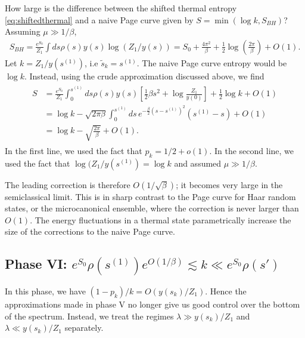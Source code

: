 \documentclass[11pt]{article}
\renewcommand{\tilde}{\widetilde}
\newcommand{\smax}{s_k}
\newcommand{\stilde}{\tilde{s}_k}
\newcommand{\sprime}{s'}
\numberwithin{equation}{section}
\begin{document}
How large is the difference between the shifted thermal entropy \eqref{eq:shiftedthermal} and a naive Page curve given by $S =  \min(\log k , S_{BH})$? Assuming $\mu \gg 1/\beta$,
\begin{align}
S_{BH} = \frac{e^{S_0}}{Z_1} \int ds \rho(s) y(s) \log(Z_1/ y(s)) = S_0 + \frac{4 \pi^2}{\beta} + \frac{1}{2} \log \left(\frac{2 \pi}{\beta}\right) + O(1).
\end{align}
Let $k = Z_1/y(s^{(1)})$, i.e $\stilde = s^{(1)}$. The naive Page curve entropy would be $\log k$. Instead, using the crude approximation discussed above, we find
\begin{align}
\begin{split}
S & = \frac{e^{S_0}}{Z_1}\int_0^{s^{(1)}} ds \rho(s) y(s) \left[\frac{1}{2} \beta s^2 +  \log \frac{Z_1}{y(0)}\right] +  \frac{1}{2} \log k + O(1) \\&= \log k  - \sqrt{2 \pi \beta} \int_0^{s^{(1)}} ds \,e^{-\frac{\beta}{2} (s - s^{(1)})^2}  (s^{(1)} - s) + O(1) \\&= \log k - \sqrt{\frac{2 \pi}{ \beta}} + O(1).
\end{split}
\end{align}
In the first line, we used the fact that $p_k = 1/2 + o(1)$. In the second line, we used the fact that $\log(Z_1/y(s^{(1)}) = \log k$ and assumed $\mu \gg 1/\beta$.

The leading correction is therefore $O(1/\sqrt{\beta})$; it becomes very large in the semiclassical limit. This is in sharp contrast to the Page curve for Haar random states, or the microcanonical ensemble, where the correction is never larger than $O(1)$. The energy fluctuations in a thermal state parametrically increase the size of the corrections to the naive Page curve.

\subsection*{Phase VI: $e^{S_0} \rho( s^{(1)})e^{O(1/\beta)} \lesssim k \ll e^{S_0} \rho(\sprime)$}
In this phase, we have $(1-p_k)/k = O(y(\smax)/Z_1)$. Hence the approximations made in phase V no longer give us good control over the bottom of the spectrum. Instead, we treat the regimes $\lambda \gg y(\smax)/Z_1$ and $\lambda \ll y(\smax)/Z_1$ separately.
\end{document}
